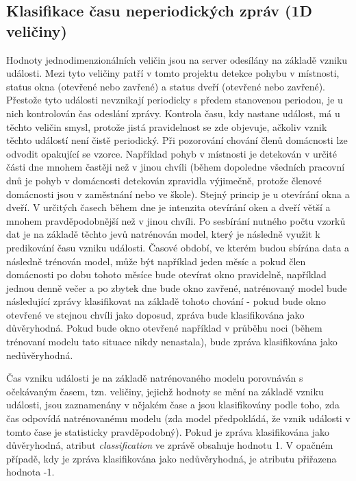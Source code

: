 \subsection{Klasifikace času neperiodických zpráv (1D veličiny)} \label{subsec:1D_quantities}
Hodnoty jednodimenzionálních veličin jsou na server odesílány na základě vzniku události. Mezi tyto veličiny patří v tomto projektu detekce pohybu v místnosti, status okna (otevřené nebo zavřené) a status dveří (otevřené nebo zavřené). Přestože tyto události nevznikají periodicky s předem stanovenou periodou, je u nich kontrolován čas odeslání zprávy. Kontrola času, kdy nastane událost, má u těchto veličin smysl, protože jistá pravidelnost se zde objevuje, ačkoliv vznik těchto událostí není čistě periodický. Při pozorování chování členů domácnosti lze odvodit opakující se vzorce. Například pohyb v místnosti je detekován v určité části dne mnohem častěji než v jinou chvíli (během dopoledne všedních pracovní dnů je pohyb v domácnosti detekován zpravidla výjimečně, protože členové domácnosti jsou v zaměstnání nebo ve škole). Stejný princip je u otevírání okna a dveří. V určitých časech během dne je intenzita otevírání oken a dveří větší a mnohem pravděpodobnější  než v jinou chvíli. Po sesbírání nutného počtu vzorků dat je na základě těchto jevů natrénován model, který je následně využit k predikování času vzniku události. Časové období, ve kterém budou sbírána data a následně trénován model, může být například jeden měsíc a pokud člen domácnosti po dobu tohoto měsíce bude otevírat okno pravidelně, například jednou denně večer a po zbytek dne bude okno zavřené, natrénovaný model bude následující zprávy klasifikovat na základě tohoto chování - pokud bude okno otevřené ve stejnou chvíli jako doposud, zpráva bude klasifikována jako důvěryhodná. Pokud bude okno otevřené například v průběhu noci (během trénovaní modelu tato situace nikdy nenastala), bude zpráva klasifikována jako nedůvěryhodná.\par
Čas vzniku události je na základě natrénovaného modelu porovnáván s očekávaným časem, tzn. veličiny, jejichž hodnoty se mění na základě vzniku události, jsou zaznamenány v nějakém čase a jsou klasifikovány podle toho, zda čas odpovídá natrénovanému modelu (zda model předpokládá, že vznik události v tomto čase je statisticky pravděpodobný). Pokud je zpráva klasifikována jako důvěryhodná, atribut \textit{classification} ve zprávě obsahuje hodnotu 1. V opačném případě, kdy je zpráva klasifikována jako nedůvěryhodná, je atributu přiřazena hodnota -1. 

